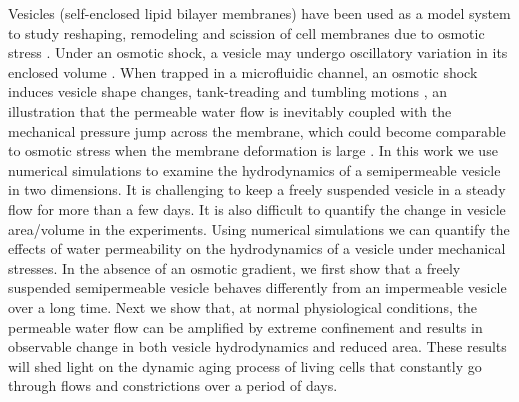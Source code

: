\documentclass[9pt,twocolumn,twoside,lineno]{pnas-new}
\begin{document}
Vesicles (self-enclosed lipid bilayer membranes) have been used as a model system to study reshaping, remodeling and scission of cell membranes due to osmotic stress \cite{OgleckaEtAl2014_eLife,CamposSaric2020_bioRxiv,Dimova2020_GVB,BhatiaChrist2020_SoftMatt}. Under an osmotic shock, a vesicle may undergo oscillatory variation in its enclosed volume \cite{ChabanonHoLiedberg2017_BJ}. When trapped in a microfluidic channel, an osmotic shock induces 
 vesicle shape changes, tank-treading and tumbling motions \cite{BhatiaRobinsonDimova2020_SoftMatt,BhatiaChrist2020_SoftMatt}, an illustration that the permeable water flow is inevitably coupled with the mechanical pressure jump across the membrane\cite{yao-mor2017}, which could become comparable to osmotic stress when the membrane deformation is large \cite{LiMoriSun2015_PRL,yao-mor2017}.  In this work we use numerical simulations to examine the hydrodynamics of a semipermeable vesicle in two dimensions. 
 It is challenging to keep a freely suspended vesicle in a steady flow for more than a few days. It is also difficult to quantify the change in vesicle area/volume in the experiments.
 Using numerical simulations we can quantify  the effects of water permeability on the hydrodynamics of a vesicle under mechanical stresses. 
 In the absence of an osmotic gradient, we first show that a freely suspended semipermeable vesicle behaves differently from an impermeable vesicle over a long time. Next we show that, at normal physiological conditions, the permeable water flow can be amplified by extreme confinement and results in observable change in both vesicle hydrodynamics and reduced area. 
 These results will shed light on the dynamic aging process of living cells that constantly go through flows and constrictions over a period of days.
 
 
%
\end{document}
